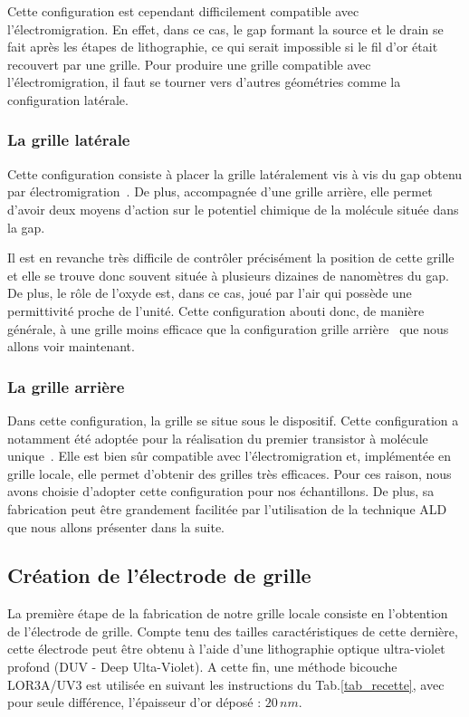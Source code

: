 Cette configuration est cependant difficilement compatible avec l'électromigration. En effet, dans ce cas, le gap formant la source et le drain se fait après les étapes de lithographie, ce qui serait impossible si le fil d'or était recouvert par une grille. Pour produire une grille compatible avec l'électromigration, il faut se tourner vers d'autres géométries comme la configuration latérale.

\subsubsection{La grille latérale}
Cette configuration consiste à placer la grille latéralement vis à vis du gap obtenu par électromigration~\cite{Mangin2009}. De plus, accompagnée d'une grille arrière, elle permet d'avoir deux moyens d'action sur le potentiel chimique de la molécule située dans la gap. 

Il est en revanche très difficile de contr\^oler précisément la position de cette grille et elle se trouve donc souvent située à plusieurs dizaines de nanomètres du gap. De plus, le r\^ole de l'oxyde est, dans ce cas, joué par l'air qui possède une permittivité proche de l'unité. Cette configuration abouti donc, de manière générale, à une grille moins efficace que la configuration grille arrière~\cite{Aurore2009} que nous allons voir maintenant.


\subsubsection{La grille arrière}
Dans cette configuration, la grille se situe sous le dispositif. Cette configuration a notamment été adoptée pour la réalisation du premier transistor à molécule unique~\cite{Park2000}. Elle est bien s\^ur compatible avec l'électromigration et, implémentée en grille locale, elle permet d'obtenir des grilles très efficaces. Pour ces raison, nous avons choisie d’adopter cette configuration pour nos échantillons. De plus, sa fabrication peut \^etre grandement facilitée par l'utilisation de la technique ALD que nous allons présenter dans la suite.


\subsection{Création de l'électrode de grille}

La première étape de la fabrication de notre grille locale consiste en l'obtention de l'électrode de grille. Compte tenu des tailles caractéristiques de cette dernière, cette électrode peut \^etre obtenu à l'aide d'une lithographie optique ultra-violet profond (DUV - Deep Ulta-Violet). A cette fin, une méthode bicouche LOR3A/UV3 est utilisée en suivant les instructions du Tab.\ref{tab_recette}, avec pour seule différence, l'épaisseur d'or déposé : $20\,nm$.

